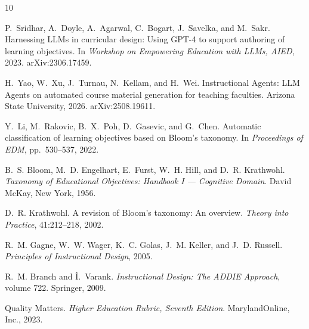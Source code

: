 \documentclass[11pt,a4paper]{article}
\begin{document}
\begin{thebibliography}{10}

P.~Sridhar, A.~Doyle, A.~Agarwal, C.~Bogart, J.~Savelka, and M.~Sakr.
\newblock Harnessing {LLMs} in curricular design: Using {GPT-4} to support authoring of learning objectives.
\newblock In \textit{Workshop on Empowering Education with LLMs, AIED}, 2023.
\newblock arXiv:2306.17459.

H.~Yao, W.~Xu, J.~Turnau, N.~Kellam, and H.~Wei.
\newblock Instructional Agents: {LLM} Agents on automated course material generation for teaching faculties.
\newblock Arizona State University, 2026.
\newblock arXiv:2508.19611.

Y.~Li, M.~Rakovic, B.~X.~Poh, D.~Gasevic, and G.~Chen.
\newblock Automatic classification of learning objectives based on {Bloom's} taxonomy.
\newblock In \textit{Proceedings of EDM}, pp.~530--537, 2022.

B.~S. Bloom, M.~D. Engelhart, E.~Furst, W.~H. Hill, and D.~R. Krathwohl.
\newblock \textit{Taxonomy of Educational Objectives: Handbook {I} --- Cognitive Domain}.
\newblock David McKay, New York, 1956.

D.~R. Krathwohl.
\newblock A revision of {Bloom's} taxonomy: An overview.
\newblock \textit{Theory into Practice}, 41:212--218, 2002.

R.~M. Gagne, W.~W. Wager, K.~C. Golas, J.~M. Keller, and J.~D. Russell.
\newblock \textit{Principles of Instructional Design}, 2005.

R.~M. Branch and {\.I}.~Varank.
\newblock \textit{Instructional Design: The ADDIE Approach}, volume 722.
\newblock Springer, 2009.

Quality Matters.
\newblock \textit{Higher Education Rubric, Seventh Edition}.
\newblock MarylandOnline, Inc., 2023.

\end{thebibliography}
\end{document}
